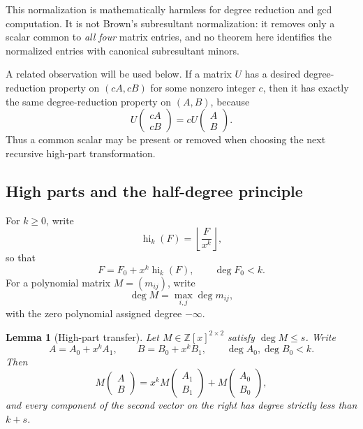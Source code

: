 \documentclass[11pt]{book}
\newtheorem{lemma}[theorem]{Lemma}
\theoremstyle{definition}
\newcommand{\ZZ}{\mathbb Z}
\begin{document}
This normalization is mathematically harmless for degree reduction and gcd
computation.  It is not Brown's subresultant normalization: it removes only a
scalar common to \emph{all four} matrix entries, and no theorem here identifies
the normalized entries with canonical subresultant minors.

A related observation will be used below.  If a matrix $U$ has a desired
degree-reduction property on $(cA,cB)$ for some nonzero integer $c$, then it
has exactly the same degree-reduction property on $(A,B)$, because
\[
 U\begin{pmatrix}cA\\cB\end{pmatrix}
 =cU\begin{pmatrix}A\\B\end{pmatrix}.
\]
Thus a common scalar may be present or removed when choosing the next recursive
high-part transformation.

\subsection{High parts and the half-degree principle}

For $k\ge0$, write
\[
 \operatorname{hi}_k(F)=\left\lfloor\frac{F}{x^k}\right\rfloor,
\]
so that
\[
 F=F_0+x^k\operatorname{hi}_k(F),
 \qquad \deg F_0<k.
\]
For a polynomial matrix $M=(m_{ij})$, write
\[
 \deg M=\max_{i,j}\deg m_{ij},
\]
with the zero polynomial assigned degree $-\infty$.

\begin{lemma}[High-part transfer]\label{lem:hgcd-high-part-transfer}
Let $M\in\ZZ[x]^{2\times2}$ satisfy $\deg M\le s$.  Write
\[
 A=A_0+x^kA_1,
 \qquad
 B=B_0+x^kB_1,
 \qquad
 \deg A_0,\deg B_0<k.
\]
Then
\begin{equation}\label{eq:hgcd-high-part-transfer}
 M\begin{pmatrix}A\\B\end{pmatrix}
 =x^kM\begin{pmatrix}A_1\\B_1\end{pmatrix}
  +M\begin{pmatrix}A_0\\B_0\end{pmatrix},
\end{equation}
and every component of the second vector on the right has degree strictly
less than $k+s$.
\end{lemma}
\end{document}
